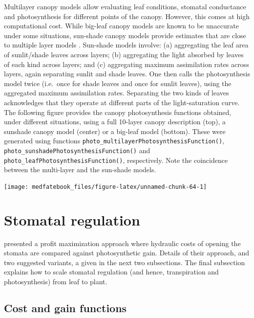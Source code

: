 \documentclass[]{book}
\begin{document}
Multilayer canopy models allow evaluating leaf conditions, stomatal conductance and photosynthesis for different points of the canopy. However, this comes at high computational cost. While big-leaf canopy models are known to be unaccurate under some situations, sun-shade canopy models \citep{DePury1997} provide estimates that are close to multiple layer models \citep{Hikosaka2016}. Sun-shade models involve: (a) aggregating the leaf area of sunlit/shade leaves across layers; (b) aggregating the light absorbed by leaves of each kind across layers; and (c) aggregating maximum assimilation rates across layers, again separating sunlit and shade leaves. One then calls the photosynthesis model twice (i.e.~once for shade leaves and once for sunlit leaves), using the aggregated maximum assimilation rates. Separating the two kinds of leaves acknowledges that they operate at different parts of the light-saturation curve. The following figure provides the canopy photosynthesis functions obtained, under different situations, using a full 10-layer canopy description (top), a sunshade canopy model (center) or a big-leaf model (bottom). These were generated using functions \texttt{photo\_multilayerPhotosynthesisFunction()}, \texttt{photo\_sunshadePhotosynthesisFunction()} and \texttt{photo\_leafPhotosynthesisFunction()}, respectively. Note the coincidence between the multi-layer and the sun-shade models.

\begin{center}\texttt{[image: medfatebook\_files/figure-latex/unnamed-chunk-64-1]} \end{center}

\hypertarget{stomatal-regulation}{%
\section{Stomatal regulation}\label{stomatal-regulation}}

\citet{Sperry2016} presented a profit maximization approach where hydraulic costs of opening the stomata are compared against photosynthetic gain. Details of their approach, and two suggested variants, a given in the next two subsections. The final subsection explains how to scale stomatal regulation (and hence, transpiration and photosynthesis) from leaf to plant.

\hypertarget{cost-and-gain-functions}{%
\subsection{Cost and gain functions}\label{cost-and-gain-functions}}
\end{document}
